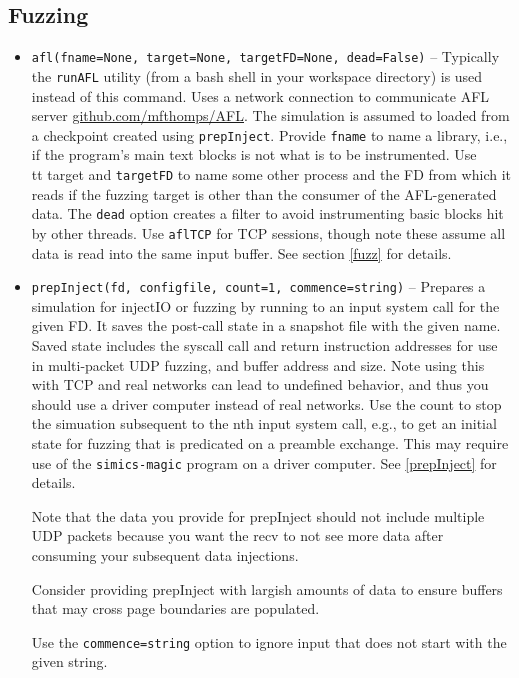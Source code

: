 \documentclass[titlepage]{article}
\begin{document}
\subsection{Fuzzing}
\begin{itemize}

\item{\tt afl(fname=None, target=None, targetFD=None, dead=False)} -- Typically the {\tt runAFL} utility (from a bash shell in your workspace directory) is used instead of this command.  Uses a network connection to communicate AFL server \url{github.com/mfthomps/AFL}.  
The simulation is assumed to loaded from a checkpoint created using {\tt prepInject}.  Provide {\tt fname} to name a library, i.e., if the program's main
text blocks is not what is to be instrumented.
Use {\\tt target} and {\tt targetFD} to name some other process 
and the FD from which it reads if the fuzzing target is other
than the consumer of the AFL-generated data.  The {\tt dead} option creates a filter to avoid instrumenting basic blocks hit by other threads.
Use {\tt aflTCP} for TCP sessions, though note these assume all data is read into
the same input buffer.  
See section \ref{fuzz} for details.

\item{\tt prepInject(fd, configfile, count=1, commence=string)} -- Prepares a simulation for injectIO or fuzzing by running to an input system call for the given FD.  It saves the post-call state in a snapshot
file with the given name.  Saved state includes the syscall call and return instruction addresses for use in multi-packet UDP fuzzing, and buffer address and size.
Note using this with TCP and real networks can lead to undefined behavior, and thus you should use a driver computer instead of real networks.  
Use the count to stop the simuation subsequent to the nth input system call, e.g., to get an initial state for fuzzing that is predicated on a preamble exchange.
This may require use of the {\tt simics-magic} program on a driver computer.  See \ref{prepInject} for details.

Note that the data you provide for prepInject should not include multiple UDP packets because you want the recv to not see more data after consuming your
subsequent data injections.

Consider providing prepInject with largish amounts of data to ensure buffers that may cross page boundaries are populated.

Use the {\tt commence=string} option to ignore input that does not start with the given string.  


\end{itemize}
\end{document}

